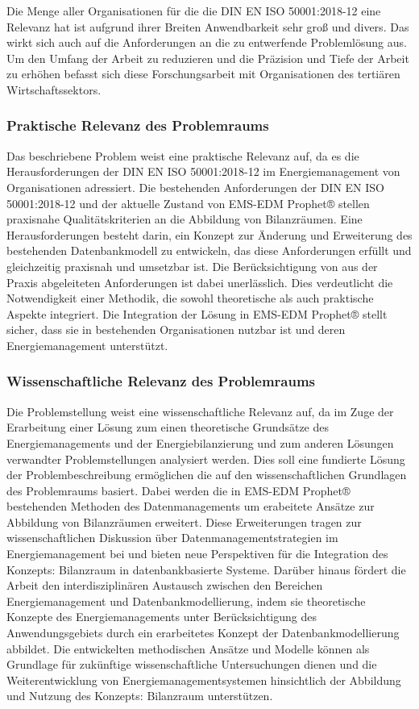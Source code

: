 Die Menge aller Organisationen für die die DIN EN ISO 50001:2018-12 eine Relevanz hat ist aufgrund ihrer Breiten Anwendbarkeit sehr groß und divers. 
Das wirkt sich auch auf die Anforderungen an die zu entwerfende Problemlösung aus. 
Um den Umfang der Arbeit zu reduzieren und die Präzision und Tiefe der Arbeit zu erhöhen befasst sich diese Forschungsarbeit mit Organisationen des tertiären Wirtschaftssektors.

\subsubsection{Praktische Relevanz des Problemraums} 
Das beschriebene Problem weist eine praktische Relevanz auf, da es die Herausforderungen der DIN EN ISO 50001:2018-12
im Energiemanagement von Organisationen adressiert.
Die bestehenden Anforderungen der DIN EN ISO 50001:2018-12 und der aktuelle Zustand von EMS-EDM Prophet® stellen praxisnahe Qualitätskriterien an die Abbildung von Bilanzräumen.
Eine Herausforderungen besteht darin, ein Konzept zur Änderung und Erweiterung des bestehenden Datenbankmodell zu entwickeln, das diese Anforderungen erfüllt und gleichzeitig praxisnah und umsetzbar ist.
Die Berücksichtigung von aus der Praxis abgeleiteten Anforderungen ist dabei unerlässlich.
Dies verdeutlicht die Notwendigkeit einer Methodik, die sowohl theoretische als auch praktische Aspekte integriert.
Die Integration der Lösung in EMS-EDM Prophet® stellt sicher, dass sie in bestehenden Organisationen nutzbar ist und deren Energiemanagement unterstützt.

\subsubsection{Wissenschaftliche Relevanz des Problemraums} 
Die Problemstellung weist eine wissenschaftliche Relevanz auf, da im Zuge der Erarbeitung einer Lösung zum einen theoretische Grundsätze des Energiemanagements und 
der Energiebilanzierung und zum anderen Lösungen verwandter Problemstellungen analysiert werden.
Dies soll eine fundierte Lösung der Problembeschreibung ermöglichen die auf den wissenschaftlichen Grundlagen des Problemraums basiert.  
Dabei werden die in EMS-EDM Prophet® bestehenden Methoden des Datenmanagements um erabeitete Ansätze zur Abbildung von Bilanzräumen erweitert.
Diese Erweiterungen tragen zur wissenschaftlichen Diskussion über Datenmanagementstrategien im Energiemanagement bei und bieten neue Perspektiven für die 
Integration des Konzepts: Bilanzraum in datenbankbasierte Systeme.
Darüber hinaus fördert die Arbeit den interdisziplinären Austausch zwischen den Bereichen Energiemanagement und Datenbankmodellierung, indem sie 
theoretische Konzepte des Energiemanagements unter Berücksichtigung des Anwendungsgebiets durch ein erarbeitetes Konzept der Datenbankmodellierung abbildet.
Die entwickelten methodischen Ansätze und Modelle können als Grundlage für zukünftige wissenschaftliche Untersuchungen dienen und die Weiterentwicklung 
von Energiemanagementsystemen hinsichtlich der Abbildung und Nutzung des Konzepts: Bilanzraum unterstützen.